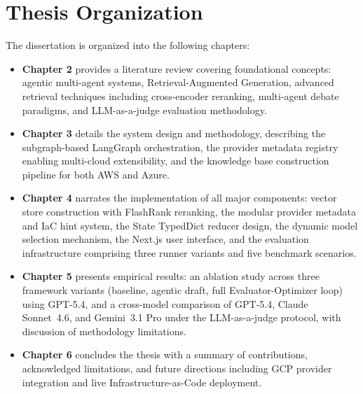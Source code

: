 \section{Thesis Organization}

The dissertation is organized into the following chapters:

\begin{itemize}
    \item \textbf{Chapter 2} provides a literature review covering foundational concepts: agentic multi-agent systems, Retrieval-Augmented Generation, advanced retrieval techniques including cross-encoder reranking, multi-agent debate paradigms, and LLM-as-a-judge evaluation methodology.
    \item \textbf{Chapter 3} details the system design and methodology, describing the subgraph-based LangGraph orchestration, the provider metadata registry enabling multi-cloud extensibility, and the knowledge base construction pipeline for both AWS and Azure.
    \item \textbf{Chapter 4} narrates the implementation of all major components: vector store construction with FlashRank reranking, the modular provider metadata and IaC hint system, the State TypedDict reducer design, the dynamic model selection mechanism, the Next.js user interface, and the evaluation infrastructure comprising three runner variants and five benchmark scenarios.
    \item \textbf{Chapter 5} presents empirical results: an ablation study across three framework variants (baseline, agentic draft, full Evaluator-Optimizer loop) using GPT-5.4, and a cross-model comparison of GPT-5.4, Claude Sonnet~4.6, and Gemini~3.1 Pro under the LLM-as-a-judge protocol, with discussion of methodology limitations.
    \item \textbf{Chapter 6} concludes the thesis with a summary of contributions, acknowledged limitations, and future directions including GCP provider integration and live Infrastructure-as-Code deployment.
\end{itemize}